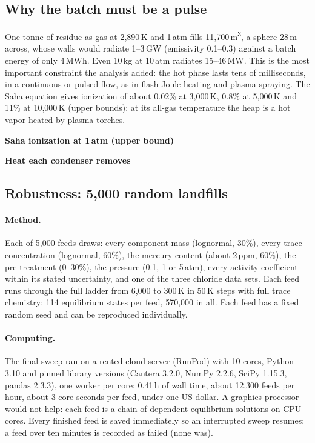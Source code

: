 \documentclass[11pt,a4paper]{article}
\begin{document}
\subsection{Why the batch must be a pulse}\label{sec:chamber}
One tonne of residue as gas at 2,890\,K and 1\,atm fills 11,700\,m\textsuperscript{3}, a sphere 28\,m across, whose walls would radiate 1--3\,GW (emissivity 0.1--0.3) against a batch energy of only 4\,MWh. Even 10\,kg at 10\,atm radiates 15--46\,MW. This is the most important constraint the analysis added: the hot phase lasts tens of milliseconds, in a continuous or pulsed flow, as in flash Joule heating \citep{deng2021} and plasma spraying. The Saha equation gives ionization of about 0.02\% at 3,000\,K, 0.8\% at 5,000\,K and 11\% at 10,000\,K (upper bounds): at its all-gas temperature the heap is a hot vapor heated by plasma torches.

\begin{center}
\begin{minipage}[t]{0.4\textwidth}\centering\textbf{Saha ionization at 1\,atm (upper bound)}\\[3pt]\end{minipage}\hfill
\begin{minipage}[t]{0.52\textwidth}\centering\textbf{Heat each condenser removes}\\[3pt]\end{minipage}
\end{center}

\subsection{Robustness: 5,000 random landfills}\label{sec:sweep}
\paragraph{Method.} Each of 5,000 feeds draws: every component mass (lognormal, 30\%), every trace concentration (lognormal, 60\%), the mercury content (about 2\,ppm, 60\%), the pre-treatment (0--30\%), the pressure (0.1, 1 or 5\,atm), every activity coefficient within its stated uncertainty, and one of the three chloride data sets. Each feed runs through the full ladder from 6,000 to 300\,K in 50\,K steps with full trace chemistry: 114 equilibrium states per feed, 570,000 in all. Each feed has a fixed random seed and can be reproduced individually.

\paragraph{Computing.} The final sweep ran on a rented cloud server (RunPod) with 10 cores, Python 3.10 and pinned library versions (Cantera 3.2.0, NumPy 2.2.6, SciPy 1.15.3, pandas 2.3.3), one worker per core: 0.41\,h of wall time, about 12,300 feeds per hour, about 3 core-seconds per feed, under one US dollar. A graphics processor would not help: each feed is a chain of dependent equilibrium solutions on CPU cores. Every finished feed is saved immediately so an interrupted sweep resumes; a feed over ten minutes is recorded as failed (none was).
\end{document}
